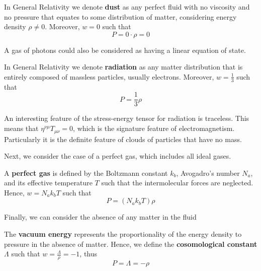 \documentclass{article}
\begin{document}
\begin{exmp}
 			\begin{defn}
 				In General Relativity we denote \textbf{dust} as any perfect fluid with no viscosity and no pressure that equates to some distribution of matter, considering energy density $\rho \neq 0$. Moreover, $w=0$ such that
 				\begin{equation}
 					\label{eq:Dust}
 					P = 0 \cdot \rho = 0
 				\end{equation}
 				
 			\end{defn}
 			A gas of photons could also be considered as having a linear equation of state.
 			\begin{defn}
 				In General Relativity we denote \textbf{radiation} as any matter distribution that is entirely composed of massless particles, usually electrons. Moreover, $w=\frac13$ such that
 				\begin{equation}
 					\label{eq:Radiation}
 					P = \frac13 \rho
 				\end{equation}
 			\end{defn}
 			An interesting feature of the stress-energy tensor for radiation is traceless. This means that $\eta^{\nu\mu}T_{\mu\nu} = 0$, which is the signature feature of electromagnetism. Particularly it is the definite feature of clouds of particles that have no mass. 
 			
 			Next, we consider the case of a perfect gas, which includes all ideal gases.
 			\begin{defn}
 				A \textbf{perfect gas} is defined by the Boltzmann constant $k_b$, Avogadro's number $N_a$, and its effective temperature $T$ such that the intermolecular forces are neglected. Hence, $w = N_a k_b T$ such that
 				\begin{equation}
 					\label{eq:PerfectGas}
 					P = \left(N_a k_b T\right) \rho
 				\end{equation}
 			\end{defn}
 			Finally, we can consider the absence of any matter in the fluid
 			\begin{defn}
 				The \textbf{vacuum energy} represents the proportionality of the energy density to pressure in the absence of matter. Hence, we define the \textbf{cosomological constant} $\Lambda$ such that $w = \frac{\Lambda}{\rho} = -1$, thus
 				\begin{equation}
 					\label{VacuumEnergy}
 					P = \Lambda = -\rho
 				\end{equation}
 			\end{defn}
 		\end{exmp}
\end{document}
